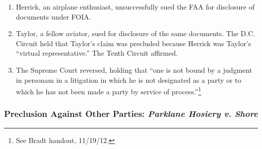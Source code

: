 \begin{enumerate}
    \item Herrick, an airplane enthusiast, unsuccessfully sued the FAA for disclosure of 
    documents under FOIA.
    \item Taylor, a fellow aviator, sued for disclosure of the same 
    documents. The D.C. Circuit held that Taylor's claim was precluded because 
    Herrick was Taylor's ``virtual representative.'' The Tenth Circuit 
    affirmed.
    \item The Supreme Court reversed, holding that ``one is not bound by a 
    judgment in personam in a litigation in which he is not designated as a 
    party or to which he has not been made a party by service of 
    process.''\footnote{See Bradt handout, 11/19/12.}
\end{enumerate}

\subsubsection{Preclusion Against Other Parties: \emph{Parklane Hosiery v. Shore}}

